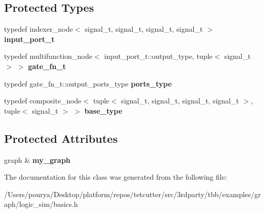 \subsection*{Protected Types}
\begin{DoxyCompactItemize}
\item 
\hypertarget{classgate_3_014_01_4_acfb16132f82463dc59e934db9cee4984}{}typedef indexer\+\_\+node$<$ signal\+\_\+t, signal\+\_\+t, signal\+\_\+t, signal\+\_\+t $>$ {\bfseries input\+\_\+port\+\_\+t}\label{classgate_3_014_01_4_acfb16132f82463dc59e934db9cee4984}

\item 
\hypertarget{classgate_3_014_01_4_aabf40263430dcaeceb3a595fec0e21ff}{}typedef multifunction\+\_\+node$<$ input\+\_\+port\+\_\+t\+::output\+\_\+type, tuple$<$ signal\+\_\+t $>$ $>$ {\bfseries gate\+\_\+fn\+\_\+t}\label{classgate_3_014_01_4_aabf40263430dcaeceb3a595fec0e21ff}

\item 
\hypertarget{classgate_3_014_01_4_ac577a4d1e3869067dcc6b63a436f5e95}{}typedef gate\+\_\+fn\+\_\+t\+::output\+\_\+ports\+\_\+type {\bfseries ports\+\_\+type}\label{classgate_3_014_01_4_ac577a4d1e3869067dcc6b63a436f5e95}

\item 
\hypertarget{classgate_3_014_01_4_a418223d25777fa49002e4cce18ba00ba}{}typedef composite\+\_\+node$<$ tuple$<$ signal\+\_\+t, signal\+\_\+t, signal\+\_\+t, signal\+\_\+t $>$, tuple$<$ signal\+\_\+t $>$ $>$ {\bfseries base\+\_\+type}\label{classgate_3_014_01_4_a418223d25777fa49002e4cce18ba00ba}

\end{DoxyCompactItemize}
\subsection*{Protected Attributes}
\begin{DoxyCompactItemize}
\item 
\hypertarget{classgate_3_014_01_4_aa8386943a545cc9401a700ce7953dc48}{}graph \& {\bfseries my\+\_\+graph}\label{classgate_3_014_01_4_aa8386943a545cc9401a700ce7953dc48}

\end{DoxyCompactItemize}


The documentation for this class was generated from the following file\+:\begin{DoxyCompactItemize}
\item 
/\+Users/pourya/\+Desktop/platform/repos/tetcutter/src/3rdparty/tbb/examples/graph/logic\+\_\+sim/basics.\+h\end{DoxyCompactItemize}
